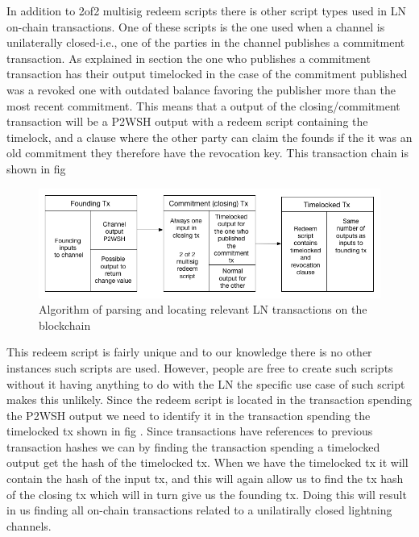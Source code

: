 In addition to 2of2 multisig redeem scripts there is other script types used in LN on-chain transactions. One of these scripts is the one used when a channel is unilaterally closed-i.e., one of the parties in the channel publishes a commitment transaction. As explained in section  the one who publishes a commitment transaction has their output timelocked in the case of the commitment published was a revoked one with outdated balance favoring the publisher more than the most recent commitment. This means that a output of the closing/commitment transaction will be a P2WSH output with a redeem script containing the timelock, and a clause where the other party can claim the founds if the it was an old commitment they therefore have the revocation key. This transaction chain is shown in fig 

\begin{figure}[h]
    \centering
    \includegraphics[width=12cm]{figures/lnchainTimelock.png}
    \caption{Algorithm of parsing and locating relevant LN transactions on the blockchain }
    \label{fig:htlc_bc}
\end{figure}

This redeem script is fairly unique and to our knowledge there is no other instances such scripts are used. However, people are free to create such scripts without it having anything to do with the LN the specific use case of such script makes this unlikely. Since the redeem script is located in the transaction spending the P2WSH output we need to identify it in the transaction spending the timelocked tx shown in fig . Since transactions have references to previous transaction hashes  we can by finding the transaction spending a timelocked output get the hash of the timelocked tx. When we have the timelocked tx it will contain the hash of the input tx, and this will again allow us to find the tx hash of the closing tx which will in turn give us the founding tx. Doing this will result in us finding all on-chain transactions related to a unilatirally closed lightning channels.


